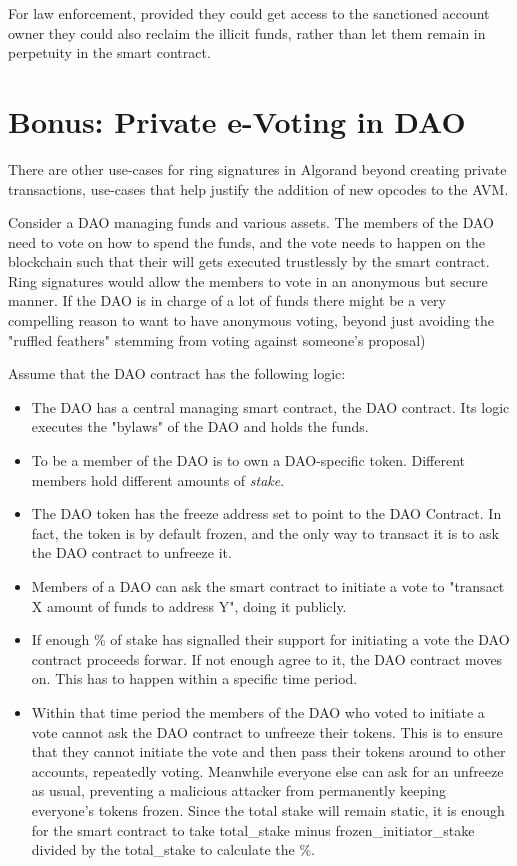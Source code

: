 \documentclass[9pt]{article}
\begin{document}
For law enforcement, provided they could get access to the sanctioned account owner they could also reclaim the illicit funds, rather than let them remain in perpetuity in the smart contract.

\section{Bonus: Private e-Voting in DAO}

There are other use-cases for ring signatures in Algorand beyond creating private transactions, use-cases that help justify the addition of new opcodes to the AVM.

Consider a DAO managing funds and various assets. The members of the DAO need to vote on how to spend the funds, and the vote needs to happen on the blockchain such that their will gets executed trustlessly by the smart contract. Ring signatures would allow the members to vote in an anonymous but secure manner. If the DAO is in charge of a lot of funds there might be a very compelling reason to want to have anonymous voting, beyond just avoiding the "ruffled feathers" stemming from voting against someone's proposal)

Assume that the DAO contract has the following logic:

\begin{itemize}
    \item The DAO has a central managing smart contract, the DAO contract. Its logic executes the "bylaws" of the DAO and holds the funds.
    \item To be a member of the DAO is to own a DAO-specific token. Different members hold different amounts of \textit{stake}.
    \item The DAO token has the freeze address set to point to the DAO Contract. In fact, the token is by default frozen, and the only way to transact it is to ask the DAO contract to unfreeze it.
    \item Members of a DAO can ask the smart contract to initiate a vote to "transact X amount of funds to address Y", doing it publicly. 
    \item If enough \% of stake has signalled their support for initiating a vote the DAO contract proceeds forwar. If not enough agree to it, the DAO contract moves on. This has to happen within a specific time period.
    \item Within that time period the members of the DAO who voted to initiate a vote cannot ask the DAO contract to unfreeze their tokens. This is to ensure that they cannot initiate the vote and then pass their tokens around to other accounts, repeatedly voting. Meanwhile everyone else can ask for an unfreeze as usual, preventing a malicious attacker from permanently keeping everyone's tokens frozen. Since the total stake will remain static, it is enough for the smart contract to take total\_stake minus frozen\_initiator\_stake divided by the total\_stake to calculate the \%.
\end{itemize}
\end{document}
